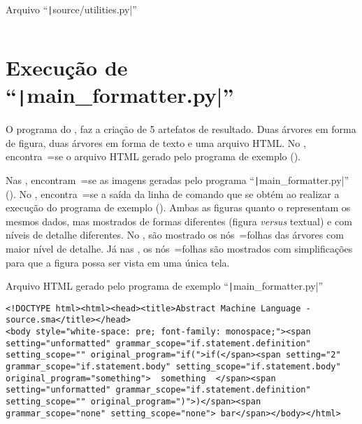 \begin{code}
\caption[Arquivo ``source/utilities.py'']{Arquivo ``\texttt|source/utilities.py|''}
\label{code:utilitiesPy}
\inputminted[firstline=39,firstnumber=1]{python3}{../source/utilities.py}
\end{code}


\chapter[main\_formatter.py]{Execução de ``\texttt|main_formatter.py|''}
\label{chapter:execucaoDeMainFormatter}

O programa do ,
faz a criação de 5 artefatos de resultado.
Duas árvores em forma de figura,
duas árvores em forma de texto e
uma arquivo HTML.
No ,
encontra~=se o arquivo HTML gerado pelo programa de exemplo ().

Nas ,
encontram~=se as imagens geradas pelo programa ``\texttt|main_formatter.py|'' ().
No ,
encontra~=se a saída da linha de comando que se obtém ao realizar a execução do programa de exemplo ().
Ambas as figuras  quanto o  representam os mesmos dados,
mas mostrados de formas diferentes (figura \textit{versus} textual) e
com níveis de detalhe diferentes.
No ,
são mostrado os nós~=folhas das árvores com maior nível de detalhe.
Já nas ,
os nós~=folhas são mostrados com simplificações para que a figura possa ser vista em uma única tela.
\begin{code}
\caption[Arquivo HTML gerado pelo programa de exemplo ``main\_formatter.py'']{Arquivo HTML gerado pelo programa de exemplo ``\texttt|main_formatter.py|''}
\label{code:MainFormatterHtml}
\begin{verbatim}
<!DOCTYPE html><html><head><title>Abstract Machine Language - source.sma</title></head>
<body style="white-space: pre; font-family: monospace;"><span setting="unformatted" grammar_scope="if.statement.definition" setting_scope="" original_program="if(">if(</span><span setting="2" grammar_scope="if.statement.body" setting_scope="if.statement.body" original_program="something">  something  </span><span setting="unformatted" grammar_scope="if.statement.definition" setting_scope="" original_program=")">)</span><span grammar_scope="none" setting_scope="none"> bar</span></body></html>
\end{verbatim}
\end{code}


